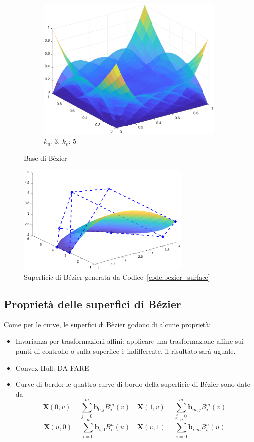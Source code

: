 \documentclass[a4paper, 10pt]{article}
\begin{document}
\begin{figure}[]
\begin{subfigure}[b]{0.3\textwidth}
      \includegraphics[width=\textwidth]{figure/bezier_surface_basis35_1.eps}
      \caption{$k_u$: $3$, $k_v$: $5$}
      \label{fig:bezier_surface_basis35_1}
  \end{subfigure}
  \caption{Base di Bézier}\label{fig:bezier_basis}
\end{figure}
\begin{figure}[]
  \centering
  \includegraphics[width=0.75\textwidth]{figure/bezier_surface1.eps}
  \caption{Superficie di Bézier generata da Codice~\ref{code:bezier_surface}}
  \label{fig:bezier_sup_code}
\end{figure} 
\subsection{Proprietà delle superfici di Bézier}
Come per le curve, le superfici di Bèzier godono di alcune proprietà:
\begin{itemize}
  \item Invarianza per trasformazioni affini: applicare una trasformazione affine sui punti di controllo o sulla superfice è indifferente, il risultato sarà uguale.

  \item Convex Hull: DA FARE
  \item Curve di bordo: le quattro curve di bordo della superficie di Bézier sono date da
  $$\mathbf{X}(0,v) = \sum_{j=0}^{m} \mathbf{b}_{0,j}B_{j}^{m}(v) \quad \mathbf{X}(1,v) = \sum_{j=0}^{m} \mathbf{b}_{m,j}B_{j}^{m}(v)$$
  $$\mathbf{X}(u, 0) = \sum_{i=0}^{n} \mathbf{b}_{i,0}B_{i}^{n}(u) \quad \mathbf{X}(u,1) = \sum_{i=0}^{n} \mathbf{b}_{i, m}B_{i}^{n}(u)$$
\end{itemize}
\end{document}
